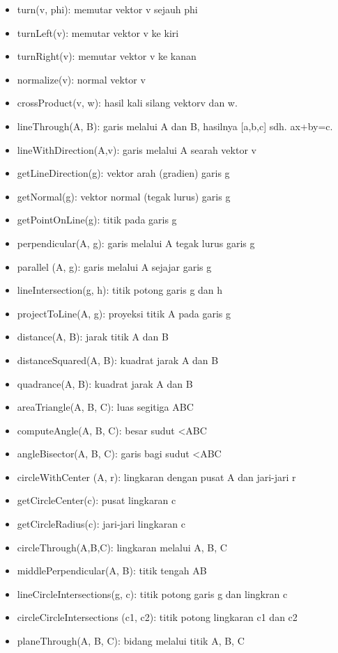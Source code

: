\documentclass[
]{book}
\providecommand{\tightlist}{%
  \setlength{\itemsep}{0pt}\setlength{\parskip}{0pt}}
\begin{document}
\begin{itemize}
\tightlist
\item
  turn(v, phi): memutar vektor v sejauh phi
\item
  turnLeft(v): memutar vektor v ke kiri\\
\item
  turnRight(v): memutar vektor v ke kanan
\item
  normalize(v): normal vektor v
\item
  crossProduct(v, w): hasil kali silang vektorv dan w.
\item
  lineThrough(A, B): garis melalui A dan B, hasilnya {[}a,b,c{]} sdh. ax+by=c.
\item
  lineWithDirection(A,v): garis melalui A searah vektor v
\item
  getLineDirection(g): vektor arah (gradien) garis g
\item
  getNormal(g): vektor normal (tegak lurus) garis g
\item
  getPointOnLine(g): titik pada garis g
\item
  perpendicular(A, g): garis melalui A tegak lurus garis g
\item
  parallel (A, g): garis melalui A sejajar garis g
\item
  lineIntersection(g, h): titik potong garis g dan h
\item
  projectToLine(A, g): proyeksi titik A pada garis g
\item
  distance(A, B): jarak titik A dan B
\item
  distanceSquared(A, B): kuadrat jarak A dan B
\item
  quadrance(A, B): kuadrat jarak A dan B
\item
  areaTriangle(A, B, C): luas segitiga ABC
\item
  computeAngle(A, B, C): besar sudut \textless ABC
\item
  angleBisector(A, B, C): garis bagi sudut \textless ABC
\item
  circleWithCenter (A, r): lingkaran dengan pusat A dan jari-jari r
\item
  getCircleCenter(c): pusat lingkaran c
\item
  getCircleRadius(c): jari-jari lingkaran c
\item
  circleThrough(A,B,C): lingkaran melalui A, B, C
\item
  middlePerpendicular(A, B): titik tengah AB
\item
  lineCircleIntersections(g, c): titik potong garis g dan lingkran c
\item
  circleCircleIntersections (c1, c2): titik potong lingkaran c1 dan c2
\item
  planeThrough(A, B, C): bidang melalui titik A, B, C
\end{itemize}
\end{document}
